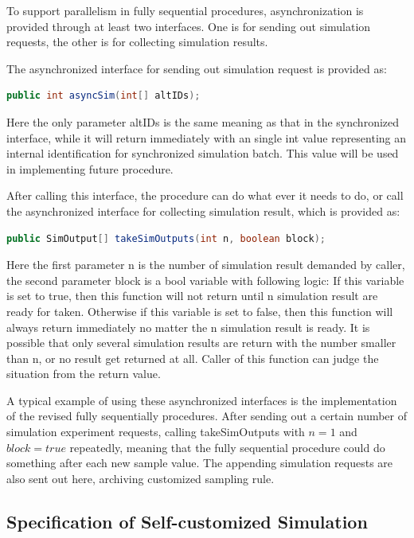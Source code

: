 \documentclass[12pt,a4]{report}
\begin{document}
To support parallelism in fully sequential procedures, asynchronization is provided through at least two interfaces. One is for sending out simulation requests, the other is for collecting simulation results.

The asynchronized interface for sending out simulation request is provided as:

\begin{lstlisting}[language=Java]
public int asyncSim(int[] altIDs);
\end{lstlisting}

Here the only parameter altIDs is the same meaning as that in the synchronized interface, while it will return immediately with an single int value representing an internal identification for synchronized simulation batch. This value will be used in implementing future procedure.

After calling this interface, the procedure can do what ever it needs to do, or call the asynchronized interface for collecting simulation result, which is provided as:

\begin{lstlisting}[language=Java]
public SimOutput[] takeSimOutputs(int n, boolean block);
\end{lstlisting}

Here the first parameter n is the number of simulation result demanded by caller, the second parameter block is a bool variable with following logic: If this variable is set to true, then this function will not return until n simulation result are ready for taken. Otherwise if this variable  is set to false, then this function will always return immediately no matter the n simulation result is ready. It is possible that only several simulation results are return with the number smaller than n, or no result get returned at all. Caller of this function can judge the situation from the return value.

A typical example of using these asynchronized interfaces is the implementation of the revised fully sequentially procedures. After sending out a certain number of simulation experiment requests, calling takeSimOutputs with $n = 1$ and $block = true$ repeatedly, meaning that the fully sequential procedure could do something after each new sample value. The appending simulation requests are also sent out here, archiving customized sampling rule.

\subsection{Specification of Self-customized Simulation}
\end{document}
